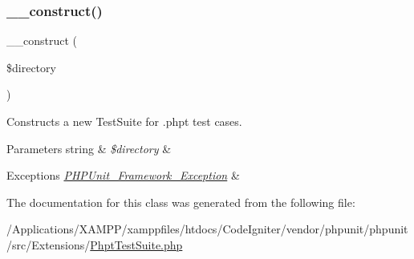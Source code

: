 \subsubsection{\texorpdfstring{\+\_\+\+\_\+construct()}{\_\_construct()}}
{\footnotesize\ttfamily \+\_\+\+\_\+construct (\begin{DoxyParamCaption}\item[{}]{\$directory }\end{DoxyParamCaption})}

Constructs a new Test\+Suite for .phpt test cases.


\begin{DoxyParams}[1]{Parameters}
string & {\em \$directory} & \\
\hline
\end{DoxyParams}

\begin{DoxyExceptions}{Exceptions}
{\em \mbox{\hyperlink{class_p_h_p_unit___framework___exception}{P\+H\+P\+Unit\+\_\+\+Framework\+\_\+\+Exception}}} & \\
\hline
\end{DoxyExceptions}


The documentation for this class was generated from the following file\+:\begin{DoxyCompactItemize}
\item 
/\+Applications/\+X\+A\+M\+P\+P/xamppfiles/htdocs/\+Code\+Igniter/vendor/phpunit/phpunit/src/\+Extensions/\mbox{\hyperlink{_phpt_test_suite_8php}{Phpt\+Test\+Suite.\+php}}\end{DoxyCompactItemize}

